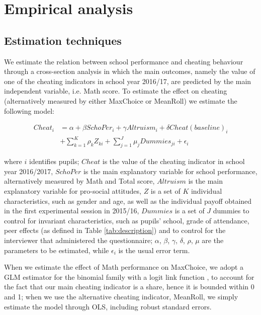 \documentclass[authoryear, preprint, review, 12pt]{elsarticle}
\begin{document}
\section{Empirical analysis}
\label{sec:Empiric}
\subsection{Estimation techniques}
\label{sec:estimation}

We estimate the relation between school performance and cheating behaviour through a cross-section analysis in which the main outcomes, namely the value of one of the cheating indicators in school year 2016/17, are predicted by the main independent variable, i.e. Math score. To estimate the effect on cheating (alternatively measured by either MaxChoice or MeanRoll) we estimate the following model:

\begin{equation}
\label{eq:model1}
\begin{split}
    Cheat_{i} &= \alpha + \beta SchoPer_{i} + \gamma Altruism_{i} + \delta Cheat (baseline)_{i} \\ 
                 &+ \sum\limits_{k=1}^K\rho_k Z_{ki} + \sum\limits_{j=1}^J\mu_j Dummies_{ji} + \epsilon_{i}
\end{split}
\end{equation}
 
where $i$ identifies pupils; $Cheat$ is the value of the cheating indicator in school year 2016/2017, $SchoPer$ is the main explanatory variable for school performance, alternatively measured by Math and Total score, $Altruism$ is the main explanatory variable for pro-social attitudes, $Z$ is a set of $K$ individual characteristics, such as gender and age, as well as the individual payoff obtained in the first experimental session in 2015/16, $Dummies$ is a set of $J$ dummies to control for invariant characteristics, such as pupils' school, grade of attendance, peer effects (as defined in Table \ref{tab:description}) and to control for the interviewer that administered the questionnaire; $\alpha$, $\beta$, $\gamma$, $\delta$, $\rho$, $\mu$ are the parameters to be estimated, while $\epsilon_{i}$ is the usual error term. 

When we estimate the effect of Math performance on MaxChoice, we adopt a GLM estimator for the binomial family with a logit link function \citep{papkewoolridge96}, to account for the fact that our  main cheating indicator is a share, hence it is bounded within 0 and 1; when we use the alternative cheating indicator, MeanRoll, we simply estimate the model through OLS, including robust standard errors.
\end{document}

